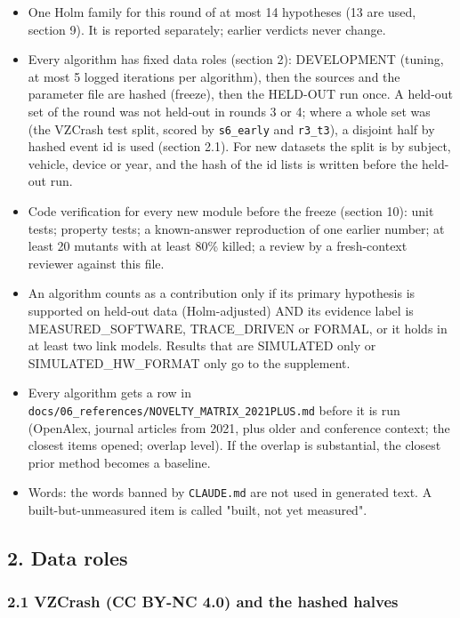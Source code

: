 \begin{itemize}
\item One Holm family for this round of at most 14 hypotheses (13 are used, section 9). It is reported separately; earlier verdicts never change.
\item Every algorithm has fixed data roles (section 2): DEVELOPMENT (tuning, at most 5 logged iterations per algorithm), then the sources and the parameter file are hashed (freeze), then the HELD-OUT run once. A held-out set of the round was not held-out in rounds 3 or 4; where a whole set was (the VZCrash test split, scored by \texttt{s6\_early} and \texttt{r3\_t3}), a disjoint half by hashed event id is used (section 2.1). For new datasets the split is by subject, vehicle, device or year, and the hash of the id lists is written before the held-out run.
\item Code verification for every new module before the freeze (section 10): unit tests; property tests; a known-answer reproduction of one earlier number; at least 20 mutants with at least 80\% killed; a review by a fresh-context reviewer against this file.
\item An algorithm counts as a contribution only if its primary hypothesis is supported on held-out data (Holm-adjusted) AND its evidence label is MEASURED\_SOFTWARE, TRACE\_DRIVEN or FORMAL, or it holds in at least two link models. Results that are SIMULATED only or SIMULATED\_HW\_FORMAT only go to the supplement.
\item Every algorithm gets a row in \texttt{docs/06\_references/NOVELTY\_MATRIX\_2021PLUS.md} before it is run (OpenAlex, journal articles from 2021, plus older and conference context; the closest items opened; overlap level). If the overlap is substantial, the closest prior method becomes a baseline.
\item Words: the words banned by \texttt{CLAUDE.md} are not used in generated text. A built-but-unmeasured item is called "built, not yet measured".
\end{itemize}

\subsection*{2. Data roles}

\subsubsection*{2.1 VZCrash (CC BY-NC 4.0) and the hashed halves}

